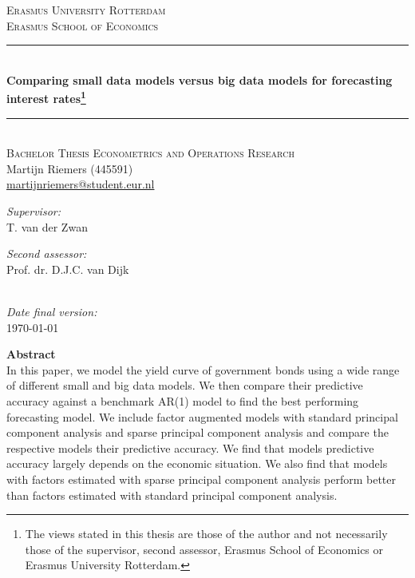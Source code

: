 \begin{titlepage}	
	\begin{center}
		\textsc{\Large{Erasmus University Rotterdam}} \\[.7cm]
		\textsc{Erasmus School of Economics} \\[0.5cm]
		
		\rule{\linewidth}{0.5mm} \\[0.4cm]
		\huge{\bfseries{Comparing small data models versus big data models for forecasting interest rates\footnote{The views stated in this thesis are those of the author and not necessarily those of the supervisor, second assessor, Erasmus School of Economics or Erasmus University Rotterdam.}}} \\
		\rule{\linewidth}{0.5mm} \\[.5cm]
		
		\textsc{\large{Bachelor Thesis Econometrics and Operations Research}} \\[.5cm]
		
		\large{Martijn Riemers (445591)} \\
		\large{\href{mailto:martijnriemers@student.eur.nl}{martijnriemers@student.eur.nl}} \\[.75cm]	
		
		\begin{minipage}[t]{0.4\textwidth}
		\center
		\large{\emph{Supervisor:}}\\
		\large{T. van der Zwan}
		\end{minipage}
		\begin{minipage}[t]{0.4\textwidth}
		\center
		\large{\emph{Second assessor:}} \\
		\large{Prof. dr. D.J.C. van Dijk}
		\end{minipage}\\[.75cm]
		
		\large{\emph{Date final version:}} \\
		\large{\today} \\[4cm]
	\end{center}
		
		
	{\setlength{\parindent}{0cm}
	\textbf{Abstract} \\
	In this paper, we model the yield curve of government bonds using a wide range of different small and big data models. 
	We then compare their predictive accuracy against a benchmark AR(1) model to find the best performing forecasting model. 
	We include factor augmented models with standard principal component analysis and sparse principal component analysis and compare the respective models their predictive accuracy. 
	We find that models predictive accuracy largely depends on the economic situation. 
	We also find that models with factors estimated with sparse principal component analysis perform better than factors estimated with standard principal component analysis. 
	}
\end{titlepage}